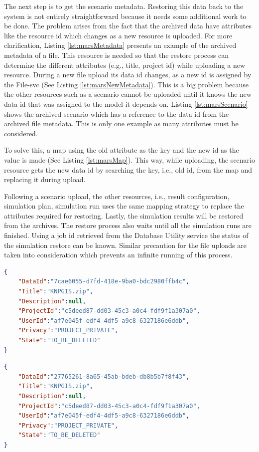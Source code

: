 The next step is to get the scenario metadata. Restoring this data back to the system is not entirely straightforward because it needs some additional 
work to be done. 
The problem arises from the fact that the archived data have attributes like the resource id which changes as a new resource is uploaded. For more clarification, 
Listing \ref{lst:marsMetadata} presents an example of the archived metadata of a file. This resource is needed so that the restore process can determine the different 
attributes (e.g., title, project id) while uploading a new resource. During a new file upload 
its data id changes, as a new id is assigned by the File-svc (See Listing \ref{lst:marsNewMetadata}). 
This is a big problem because the other resources such as a scenario cannot be uploaded until it knows the new data id that was assigned to the model it 
depends on. Listing \ref{lst:marsScenario} shows the archived scenario which has a reference to the data id from the archived file metadata. 
This is only one example as many attributes must be considered. 

To solve this, a map using the old attribute as the key and the 
new id as the value is made (See Listing \ref{lst:marsMap}).
This way, while uploading, the scenario resource gets the new data id by searching the key, i.e., old id, from the map and replacing it during upload. 

Following a scenario upload, the other resources, i.e., result configuration, simulation plan, simulation run uses the same mapping strategy to replace 
the attributes required for restoring. 
Lastly, the simulation results will be restored from the archives. The restore process also waits until all the simulation runs are finished. Using a job id retrieved from the Database 
Utility service the status of the simulation restore can be known. Similar precaution for the file uploads are taken into consideration which prevents an infinite running
of this process.


\newpage
\begin{lstlisting}[caption={Snippet of archived MARS metadata resource}, language=json,firstnumber=1, captionpos=b, label={lst:marsMetadata}]
{
    "DataId":"7cae6055-d7fd-418e-9ba0-bdc2980ffb4c",
    "Title":"KNPGIS.zip",
    "Description":null,
    "ProjectId":"c5deed87-dd03-45c3-a0c4-fdf9f1a307a0",
    "UserId":"af7e045f-edf4-4df5-a9c8-6327186e6ddb",
    "Privacy":"PROJECT_PRIVATE",
    "State":"TO_BE_DELETED"
}
\end{lstlisting}

\begin{lstlisting}[caption={Snippet of the uploaded MARS metadata resource}, language=json,firstnumber=1, captionpos=b, label={lst:marsNewMetadata}]
{
    "DataId":"27765261-8a65-45ab-bdeb-db8b5b7f8f43",
    "Title":"KNPGIS.zip",
    "Description":null,
    "ProjectId":"c5deed87-dd03-45c3-a0c4-fdf9f1a307a0",
    "UserId":"af7e045f-edf4-4df5-a9c8-6327186e6ddb",
    "Privacy":"PROJECT_PRIVATE",
    "State":"TO_BE_DELETED"
}
\end{lstlisting}

